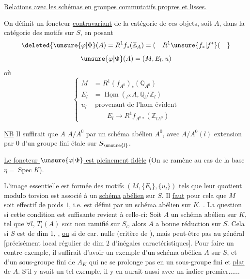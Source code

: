 \uline{Relations avec les schémas en groupes commutatifs propres et lisses.}

On définit un foncteur \uline{contravariant} de la catégorie de
ces objets, soit \(A\), dans la catégorie des motifs sur \(S\),
en posant
\[
\deleted{\unsure{\varphi|\Phi}(A)=R^1f_*(\mathbb Z_A)=
(\quad R^1\unsure{f_*|f^*}(\quad}
\]
\[
\unsure{\varphi|\Phi}(A)=(M,E_l,u)
\]
où
\[
\left\{
\begin{aligned}
M&=R^1(f_{A^0})_*(\mathbb Q_{A^0})\\
E_l&=\underline{\operatorname{Hom}}({}_{l^\infty}A,\mathbb Q_l/\mathbb Z_l)\\
u_l&\ \text{provenant de l'hom évident}\\
&\qquad E_l\longrightarrow R^1f_{A^0*}(\mathbb Z_{lA^0})
\end{aligned}
\right.
\]

\uline{NB} Il suffirait que \(A\)
 \(A/A^0\) par un schéma abélien \(A^0\), avec
\(A/A^0(l)\) extension par \(0\) d'un groupe fini étale sur \(S_{\unsure{l}}\).

\uline{Le foncteur \(\unsure{\varphi|\Phi}\) est pleinement fidèle}
(On se ramène au cas de la base \(\eta=\operatorname{Spec}K\)).

L'image essentielle est 
formée des motifs \((M,\{E_l\},\{u_l\})\) tels que
 leur quotient modulo
torsion est associé à un \uline{schéma} \uline{abélien} sur \(S\).
Il \uline{faut} pour cela que \(M\) soit effectif de poids \(1\),
i.e. est défini par un schéma abélien  sur \(K\).
 .
La question si cette condition est suffisante revient à
celle-ci: Soit \(A\) un schéma abélien sur \(K\),  tel
que \(\forall l\),  \(T_l(A)\) soit non ramifié sur \(S_l\), alors
\(A\) a bonne réduction sur \(S\). Cela  si
\(S\) est de dim \(1\), ,
\uline{ou} si de car. nulle (critère de
), mais peut-être pas au général [précisément
local régulier de dim \(2\) d'inégales caractéristiques]. Pour
faire un contre-exemple, il suffirait d'avoir un exemple
d'un schéma abélien \(A\) sur \(S\), et d'un sous-groupe fini de
\(A_K\) qui ne se prolonge pas en un sous-groupe fini et \uline{plat}
de \(A\). S'il y avait un tel exemple, il y en aurait
aussi avec un indice premier......

